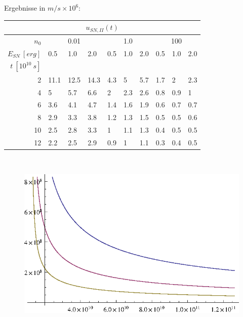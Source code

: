 Ergebnisse in $m/s \times 10^{6}$:
\begin{center}
\begin{tabular}{|r|l|l|l|l|l|l|l|l|l|}
\multicolumn{10}{c}{\(u_{SN,II}(t)\)}\\
\hline
\(n_0\) & \multicolumn{3}{|c|}{0.01} & \multicolumn{3}{|c|}{1.0} & \multicolumn{3}{|c|}{100}\\
\hline
\(E_{SN}~[erg]\) & 0.5 & 1.0 & 2.0 & 0.5 & 1.0 & 2.0 & 0.5 & 1.0 & 2.0\\
\hline
\(t~[10^{10}~s]\) & & & & & & & & & \\
\cline{1-1}
2 & 11.1 & 12.5 & 14.3 &
4.3 & 5 & 5.7 &
1.7 & 2 & 2.3 \\

4 & 5 & 5.7 & 6.6 &
2 & 2.3 & 2.6 &
0.8 & 0.9 & 1 \\

6 & 3.6 & 4.1 & 4.7 &
1.4 & 1.6 & 1.9 &
0.6 & 0.7 & 0.7 \\

8 & 2.9 & 3.3 & 3.8 &
1.2 & 1.3 & 1.5 &
0.5 & 0.5 & 0.6 \\

10 & 2.5 & 2.8 & 3.3 &
1 & 1.1 & 1.3 &
0.4 & 0.5 & 0.5 \\

12 & 2.2 & 2.5 & 2.9 &
0.9 & 1 & 1.1 &
0.3 & 0.4 & 0.5 \\
\hline
\end{tabular}\\
\end{center}
\begin{figure}[ht]
\begin{center}
\includegraphics{aufgabe6u.eps}
\end{center}
\end{figure}
